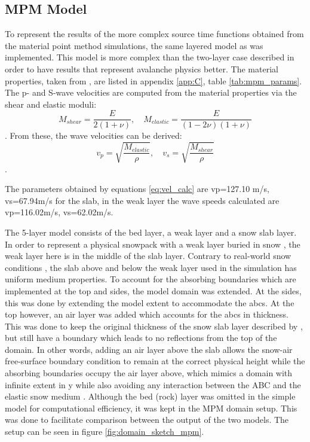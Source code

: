 \subsection{MPM Model}
\label{sec:mpm_model}
To represent the results of the more complex source time functions obtained from the material point method simulations, the same layered model as \cite{trottetTransitionSubRayleighAnticrack2022} was implemented. This model is more complex than the two-layer case described in order to have results that represent avalanche physics better. The material properties, taken from \cite{trottetTransitionSubRayleighAnticrack2022}, are listed in appendix \ref{app:C}, table \ref{tab:mpm_params}. The p- and S-wave velocities are computed from the material properties via the shear and elastic moduli: \begin{equation}
    M_{shear} = \frac{E}{2  (1 + \nu)}, \quad M_{elastic} = \frac{E}{(1 - 2  \nu) (1 + \nu)}
\end{equation} \parencite{kAkiRichards19801981}. From these, the wave velocities can be derived: \begin{equation}
    v_p = \sqrt{\frac{M_{elastic}}{\rho}}, \quad 
    v_s = \sqrt{\frac{M_{shear}}{\rho}}
    \label{eq:vel_calc}
\end{equation} \parencite{kAkiRichards19801981}.  \par

The parameters obtained by equations \ref{eq:vel_calc} are vp=127.10 m/s, vs=67.94m/s for the slab, in the weak layer the wave speeds calculated are vp=116.02m/s, vs=62.02m/s. \par

The 5-layer model consists of the bed layer, a weak layer and a snow slab layer. In order to represent a physical snowpack with a weak layer buried in snow \parencite{schweizerSnowAvalancheFormation2003}, the weak layer here is in the middle of the slab layer. Contrary to real-world snow conditions \parencite{barteltPhysicalSNOWPACKModel2002}, the slab above and below the weak layer used in the simulation has uniform medium properties. To account for the absorbing boundaries which are implemented at the top and sides, the model domain was extended. At the sides, this was done by extending the model extent to accommodate the abcs. At the top however, an air layer was added which accounts for the abcs in thickness. This was done to keep the original thickness of the snow slab layer described by \cite{trottetTransitionSubRayleighAnticrack2022}, but still have a boundary which leads to no reflections from the top of the domain. In other words, adding an air layer above the slab allows the snow-air free-surface boundary condition to remain at the correct physical height while the absorbing boundaries occupy the air layer above, which mimics a domain with infinite extent in y while also avoiding any interaction between the ABC and the elastic snow medium \parencite{afanasievSalvusFlexibleHighperformance2017}. Although the bed (rock) layer was omitted in the simple model for computational efficiency, it was kept in the MPM domain setup. This was done to facilitate comparison between the output of the two models. The setup can be seen in figure \ref{fig:domain_sketch_mpm}. 

